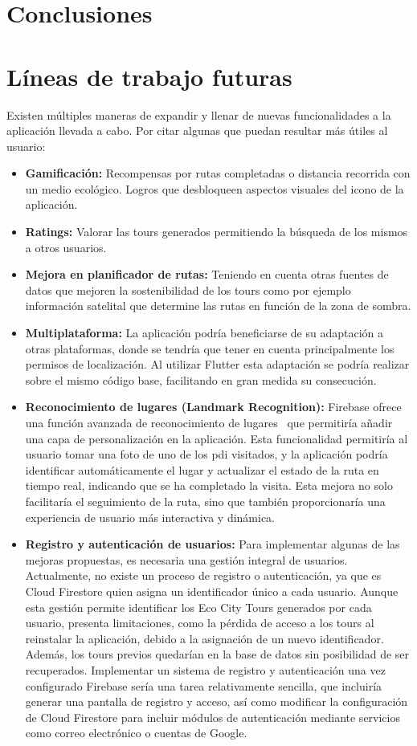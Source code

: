 \section*{Conclusiones}
\section*{Líneas de trabajo futuras}
Existen múltiples maneras de expandir y llenar de nuevas funcionalidades a la aplicación llevada a cabo.
Por citar algunas que puedan resultar más útiles al usuario:
\begin{itemize}
    \item \textbf{Gamificación:} Recompensas por rutas completadas o distancia recorrida con un medio ecológico. Logros que desbloqueen aspectos visuales del icono de la aplicación.
    \item \textbf{Ratings:} Valorar las tours generados permitiendo la búsqueda de los mismos a otros usuarios.
    \item \textbf{Mejora en planificador de rutas:} Teniendo en cuenta otras fuentes de datos que mejoren la sostenibilidad de los tours como por ejemplo información satelital que determine las rutas en función de la zona de sombra.
    \item \textbf{Multiplataforma:} La aplicación podría beneficiarse de su adaptación a otras plataformas, donde se tendría que tener en cuenta principalmente los permisos de localización. Al utilizar Flutter esta adaptación se podría realizar sobre el mismo código base, facilitando en gran medida su consecución.
	\item \textbf{Reconocimiento de lugares (Landmark Recognition):} Firebase ofrece una función avanzada de reconocimiento de lugares~\cite{firebase_mlkit_landmarks} que permitiría añadir una capa de personalización en la aplicación. Esta funcionalidad permitiría al usuario tomar una foto de uno de los \acrlong{pdi} visitados, y la aplicación podría identificar automáticamente el lugar y actualizar el estado de la ruta en tiempo real, indicando que se ha completado la visita. Esta mejora no solo facilitaría el seguimiento de la ruta, sino que también proporcionaría una experiencia de usuario más interactiva y dinámica.
	\item \textbf{Registro y autenticación de usuarios:} Para implementar algunas de las mejoras propuestas, es necesaria una gestión integral de usuarios. Actualmente, no existe un proceso de registro o autenticación, ya que es Cloud Firestore quien asigna un identificador único a cada usuario. Aunque esta gestión permite identificar los Eco City Tours generados por cada usuario, presenta limitaciones, como la pérdida de acceso a los tours al reinstalar la aplicación, debido a la asignación de un nuevo identificador. Además, los tours previos quedarían en la base de datos sin posibilidad de ser recuperados. Implementar un sistema de registro y autenticación una vez configurado Firebase sería una tarea relativamente sencilla, que incluiría generar una pantalla de registro y acceso, así como modificar la configuración de Cloud Firestore para incluir módulos de autenticación mediante servicios como correo electrónico o cuentas de Google.
\end{itemize}
